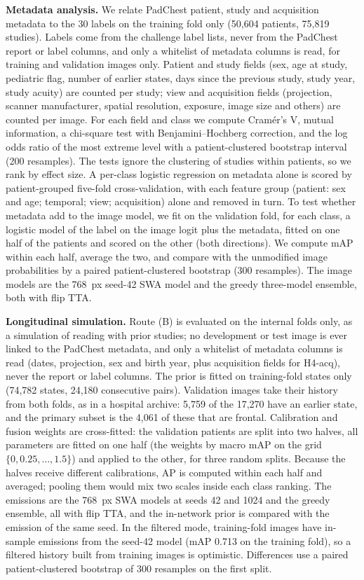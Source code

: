 \documentclass[conference]{IEEEtran}
\begin{document}
\textbf{Metadata analysis.} We relate PadChest patient, study and acquisition metadata to the 30 labels on the training fold only (50,604 patients, 75,819 studies). Labels come from the challenge label lists, never from the PadChest report or label columns, and only a whitelist of metadata columns is read, for training and validation images only. Patient and study fields (sex, age at study, pediatric flag, number of earlier states, days since the previous study, study year, study acuity) are counted per study; view and acquisition fields (projection, scanner manufacturer, spatial resolution, exposure, image size and others) are counted per image. For each field and class we compute Cram\'er's V, mutual information, a chi-square test with Benjamini--Hochberg correction, and the log odds ratio of the most extreme level with a patient-clustered bootstrap interval (200 resamples). The tests ignore the clustering of studies within patients, so we rank by effect size. A per-class logistic regression on metadata alone is scored by patient-grouped five-fold cross-validation, with each feature group (patient: sex and age; temporal; view; acquisition) alone and removed in turn. To test whether metadata add to the image model, we fit on the validation fold, for each class, a logistic model of the label on the image logit plus the metadata, fitted on one half of the patients and scored on the other (both directions). We compute mAP within each half, average the two, and compare with the unmodified image probabilities by a paired patient-clustered bootstrap (300 resamples). The image models are the 768~px seed-42 SWA model and the greedy three-model ensemble, both with flip TTA.

\textbf{Longitudinal simulation.} Route (B) is evaluated on the internal folds only, as a simulation of reading with prior studies; no development or test image is ever linked to the PadChest metadata, and only a whitelist of metadata columns is read (dates, projection, sex and birth year, plus acquisition fields for H4-acq), never the report or label columns. The prior is fitted on training-fold states only (74,782 states, 24,180 consecutive pairs). Validation images take their history from both folds, as in a hospital archive: 5,759 of the 17,270 have an earlier state, and the primary subset is the 4,061 of these that are frontal. Calibration and fusion weights are cross-fitted: the validation patients are split into two halves, all parameters are fitted on one half (the weights by macro mAP on the grid $\{0, 0.25, \dots, 1.5\}$) and applied to the other, for three random splits. Because the halves receive different calibrations, AP is computed within each half and averaged; pooling them would mix two scales inside each class ranking. The emissions are the 768~px SWA models at seeds 42 and 1024 and the greedy ensemble, all with flip TTA, and the in-network prior is compared with the emission of the same seed. In the filtered mode, training-fold images have in-sample emissions from the seed-42 model (mAP 0.713 on the training fold), so a filtered history built from training images is optimistic. Differences use a paired patient-clustered bootstrap of 300 resamples on the first split.
\end{document}
